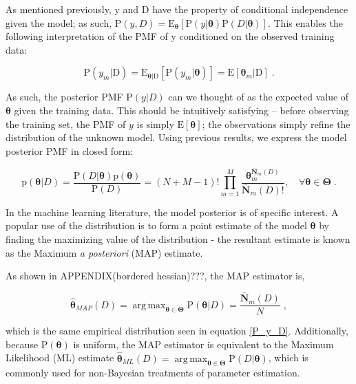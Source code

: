 \documentclass[12pt]{article}
\DeclareMathOperator*{\argmax}{arg\,max}
\begin{document}
As mentioned previously, $\mathrm{y}$ and $\mathrm{D}$ have the property of conditional independence given the model; as such, $\text{P}(y,D) = \text{E}_{\bm{\theta}} \left[ \text{P}(y | \bm{\theta}) \text{P}(D | \bm{\theta}) \right]$. This enables the following interpretation of the PMF of $\mathrm{y}$ conditioned on the observed training data:

\begin{equation}
\text{P}(y_m | \mathrm{D}) = \text{E}_{\bm{\theta} | \mathrm{D}} \left[ \text{P}(y_m|\bm{\theta}) \right] = \text{E}\left[ \bm{\theta}_m | \mathrm{D} \right] \;.
\end{equation}

As such, the posterior PMF $\text{P}(y | D)$ can we thought of as the expected value of $\bm{\theta}$ given the training data. This should be intuitively satisfying -- before observing the training set, the PMF of $y$ is simply $\text{E}[\bm{\theta}]$; the observations simply refine the distribution of the unknown model. Using previous results, we express the model posterior PMF in closed form:

\begin{equation}
\text{p}(\bm{\theta} | D) = \frac{\text{P}(D | \bm{\theta}) \text{p}(\bm{\theta})}{\text{P}(D)}
= (N+M-1)! \prod_{m=1}^M \frac{\bm{\theta}_m^{\bar{\bm{N}}_m(D)}}{\bar{\bm{N}}_m(D)!} ,  \quad  \forall \bm{\theta} \in \bm{\Theta} \;.
\end{equation}


In the machine learning literature, the model posterior is of specific interest. A popular use of the distribution is to form a point estimate of the model $\bm{\theta}$ by finding the maximizing value of the distribution - the resultant estimate is known as the Maximum \emph{a posteriori} (MAP) estimate. 

As shown in APPENDIX(bordered hessian)???, the MAP estimator is,

\begin{equation}
\hat{\bm{\theta}}_{MAP}(D) = \argmax_{\bm{\theta} \in \bm{\Theta}} \text{P}(\bm{\theta} | D) = \frac{\bar{\bm{N}}_m(D)}{N} \;,
\end{equation}

which is the same empirical distribution seen in equation \eqref{P_y_D}. Additionally, because $\text{P}(\bm{\theta})$ is uniform, the MAP estimator is equivalent to the Maximum Likelihood (ML) estimate $\hat{\bm{\theta}}_{ML}(D) = \argmax_{\bm{\theta} \in \bm{\Theta}} \text{P}(D | \bm{\theta})$, which is commonly used for non-Bayesian treatments of parameter estimation.
\end{document}
